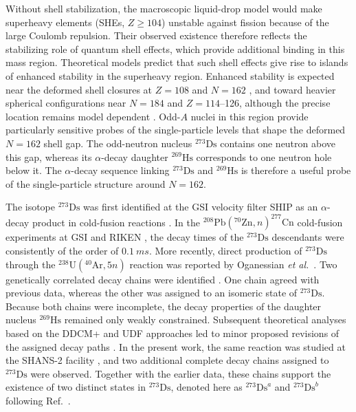 \documentclass[aps,prc,reprint,superscriptaddress,floatfix]{revtex4-2}
\begin{document}
Without shell stabilization, the macroscopic liquid-drop model would make superheavy elements (SHEs, $Z \ge 104$) unstable against fission because of the large Coulomb repulsion. Their observed existence therefore reflects the stabilizing role of quantum shell effects, which provide additional binding in this mass region. Theoretical models predict that such shell effects give rise to islands of enhanced stability in the superheavy region. Enhanced stability is expected near the deformed shell closures at $Z = 108$ and $N = 162$ \cite{dvorakDoublyMagicNucleus2006}, and toward heavier spherical configurations near $N = 184$ and $Z = 114$--126, although the precise location remains model dependent \cite{kruppa2000ShellCorrectionsSuperheavy}. Odd-$A$ nuclei in this region provide particularly sensitive probes of the single-particle levels that shape the deformed $N = 162$ shell gap. The odd-neutron nucleus $^{273}\mathrm{Ds}$ contains one neutron above this gap, whereas its $\alpha$-decay daughter $^{269}\mathrm{Hs}$ corresponds to one neutron hole below it. The $\alpha$-decay sequence linking $^{273}\mathrm{Ds}$ and $^{269}\mathrm{Hs}$ is therefore a useful probe of the single-particle structure around $N = 162$.

The isotope $^{273}\mathrm{Ds}$ was first identified at the GSI velocity filter SHIP as an $\alpha$-decay product in cold-fusion reactions \cite{hofmann2002NewResultsElements}. In the $^{208}\mathrm{Pb}(^{70}\mathrm{Zn}, n)^{277}\mathrm{Cn}$ cold-fusion experiments at GSI \cite{hofmann2002NewResultsElements,hofmann1996NewElement112} and RIKEN \cite{sumita2013NewResultProduction,morita2007ExperimentSynthesisIsotope277}, the decay times of the $^{273}\mathrm{Ds}$ descendants were consistently of the order of $0.1~\si{ms}$. More recently, direct production of $^{273}\mathrm{Ds}$ through the $^{238}\mathrm{U}(^{40}\mathrm{Ar}, 5n)$ reaction was reported by Oganessian \textit{et al.}~\cite{oganessian2024SynthesisDecayProperties}. Two genetically correlated decay chains were identified \cite{geneticcorrelations}. One chain agreed with previous data, whereas the other was assigned to an isomeric state of $^{273}\mathrm{Ds}$. Because both chains were incomplete, the decay properties of the daughter nucleus $^{269}\mathrm{Hs}$ remained only weakly constrained. Subsequent theoretical analyses based on the DDCM+ and UDF approaches led to minor proposed revisions of the assigned decay paths \cite{Wang2024}. In the present work, the same reaction was studied at the SHANS-2 facility \cite{xu2023GasfilledRecoilSeparator}, and two additional complete decay chains assigned to $^{273}\mathrm{Ds}$ were observed. Together with the earlier data, these chains support the existence of two distinct states in $^{273}\mathrm{Ds}$, denoted here as $^{273}\mathrm{Ds}^{a}$ and $^{273}\mathrm{Ds}^{b}$ following Ref.~\cite{oganessian2024SynthesisDecayProperties}.
\end{document}
